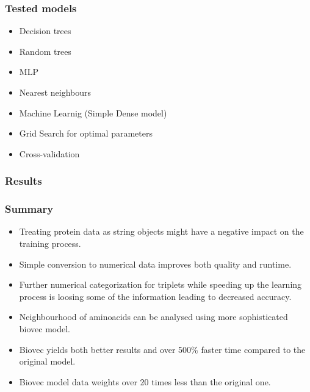 \documentclass[10pt]{beamer}
\begin{document}
\begin{frame}
\frametitle{Tested models}
\begin{itemize}
\item Decision trees
\item Random trees
\item MLP
\item Nearest neighbours
\item Machine Learnig (Simple Dense model)
\end{itemize}

\begin{itemize}
\item Grid Search for optimal parameters
\item Cross-validation
\end{itemize}
\end{frame}

\begin{frame}
\frametitle{Results}
\end{frame}

\begin{frame}
\frametitle{Summary}
\begin{itemize}
\item Treating protein data as string objects might have a negative impact on the training process.
\item Simple conversion to numerical data improves both quality and runtime.
\item Further numerical categorization for triplets while speeding up the learning process is loosing some of the information leading to decreased accuracy.
\item Neighbourhood of aminoacids can be analysed using more sophisticated biovec model.
\item Biovec yields both better results and over 500\% faster time compared to the original model.
\item Biovec model data weights over 20 times less than the original one.
\end{itemize}
\end{frame}
\end{document}
